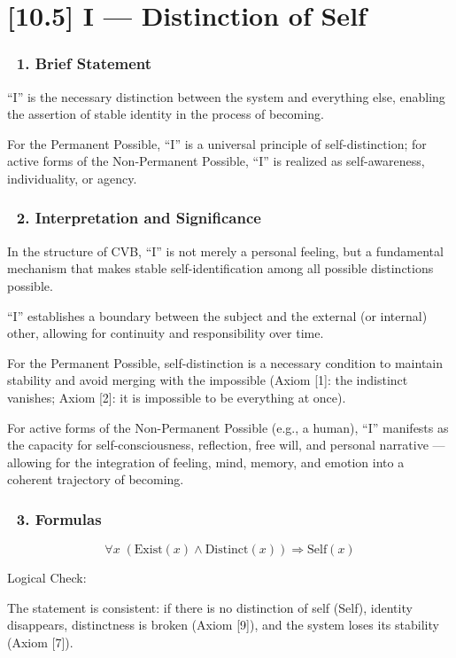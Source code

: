 \documentclass[12pt]{article}
\begin{document}
\section*{[10.5] I — Distinction of Self}

\subsubsection*{🔹 1. Brief Statement}

``I'' is the necessary distinction between the system and everything else, enabling the assertion of stable identity in the process of becoming.

For the Permanent Possible, ``I'' is a universal principle of self-distinction; for active forms of the Non-Permanent Possible, ``I'' is realized as self-awareness, individuality, or agency.

\subsubsection*{🔹 2. Interpretation and Significance}

In the structure of CVB, ``I'' is not merely a personal feeling, but a fundamental mechanism that makes stable self-identification among all possible distinctions possible.

``I'' establishes a boundary between the subject and the external (or internal) other, allowing for continuity and responsibility over time.

For the Permanent Possible, self-distinction is a necessary condition to maintain stability and avoid merging with the impossible (Axiom [1]: the indistinct vanishes; Axiom [2]: it is impossible to be everything at once).

For active forms of the Non-Permanent Possible (e.g., a human), ``I'' manifests as the capacity for self-consciousness, reflection, free will, and personal narrative — allowing for the integration of feeling, mind, memory, and emotion into a coherent trajectory of becoming.

\subsubsection*{🔹 3. Formulas}

\[
\forall x \; (\text{Exist}(x) \land \text{Distinct}(x)) \Rightarrow \text{Self}(x)
\]

Logical Check:

The statement is consistent: if there is no distinction of self (Self), identity disappears, distinctness is broken (Axiom [9]), and the system loses its stability (Axiom [7]).
\end{document}

